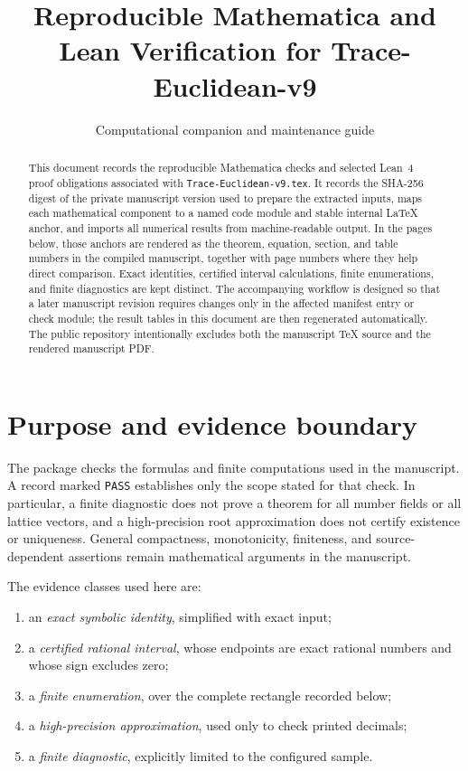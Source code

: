 \documentclass[12pt,a4paper]{amsart}
\title[Trace-Euclidean-v9 verification]{Reproducible Mathematica and Lean Verification for Trace-Euclidean-v9}
\author[Verification guide]{Computational companion and maintenance guide}
\date{}
\theoremstyle{remark}
\theoremstyle{definition}
\begin{document}
\begin{abstract}
This document records the reproducible Mathematica checks and selected Lean~4
proof obligations associated with
\texttt{Trace-Euclidean-v9.tex}.  It records the SHA-256 digest of the private
manuscript version used to prepare the extracted inputs, maps each mathematical
component to a named code module and stable internal LaTeX anchor, and imports
all numerical results from machine-readable output.  In the pages below, those anchors are rendered as the theorem,
equation, section, and table numbers in the compiled manuscript, together with
page numbers where they help direct comparison.
Exact identities, certified interval calculations, finite enumerations, and
finite diagnostics are kept distinct.  The accompanying workflow is designed
so that a later manuscript revision requires changes only in the affected
manifest entry or check module; the result tables in this document are then
regenerated automatically.
The public repository intentionally excludes both the manuscript TeX source and
the rendered manuscript PDF.
\end{abstract}
\maketitle

\section{Purpose and evidence boundary}

The package checks the formulas and finite computations used in the manuscript.
A record marked \texttt{PASS} establishes only the scope stated for that check.
In particular, a finite diagnostic does not prove a theorem for all number
fields or all lattice vectors, and a high-precision root approximation does not
certify existence or uniqueness.  General compactness, monotonicity, finiteness,
and source-dependent assertions remain mathematical arguments in the manuscript.

The evidence classes used here are:
\begin{enumerate}[label=\textup{(\roman*)}]
\item an \emph{exact symbolic identity}, simplified with exact input;
\item a \emph{certified rational interval}, whose endpoints are exact rational
numbers and whose sign excludes zero;
\item a \emph{finite enumeration}, over the complete rectangle recorded below;
\item a \emph{high-precision approximation}, used only to check printed decimals;
\item a \emph{finite diagnostic}, explicitly limited to the configured sample.
\end{enumerate}
\end{document}
